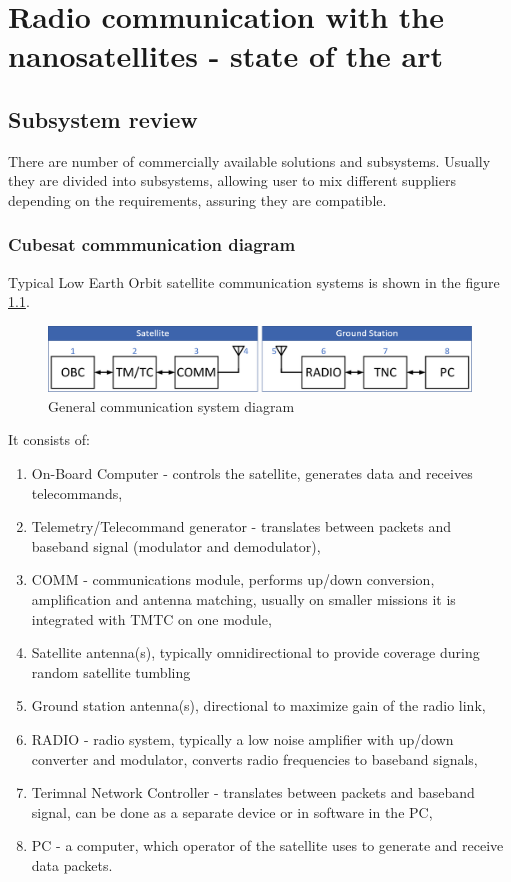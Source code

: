 \chapter{Radio communication with the nanosatellites - state of the art}

\section{Subsystem review}
There are number of commercially available solutions and subsystems. Usually they are divided into subsystems, allowing user to mix different suppliers depending on the requirements, assuring they are compatible.

\subsection{Cubesat commmunication diagram}
Typical Low Earth Orbit satellite communication systems is shown in the figure \ref{comm_diagram}.

\begin{figure}
    \centering
    \includegraphics[width=0.7\paperwidth]{img/2/comm_diagram.eps}
    \caption{General communication system diagram}
    \label{comm_diagram}
\end{figure}

It consists of:
\begin{enumerate}
    \item On-Board Computer - controls the satellite, generates data and receives telecommands,
    \item Telemetry/Telecommand generator - translates between packets and baseband signal (modulator and demodulator),
    \item COMM - communications module, performs up/down conversion, amplification and antenna matching, usually on smaller missions it is integrated with TMTC on one module,
    \item Satellite antenna(s), typically omnidirectional to provide coverage during random satellite tumbling
    \item Ground station antenna(s), directional to maximize gain of the radio link,
    \item RADIO - radio system, typically a low noise amplifier with up/down converter and modulator, converts radio frequencies to baseband signals,
    \item Terimnal Network Controller - translates between packets and baseband signal, can be done as a separate device or in software in the PC,
    \item PC - a computer, which operator of the satellite uses to generate and receive data packets.
\end{enumerate}

